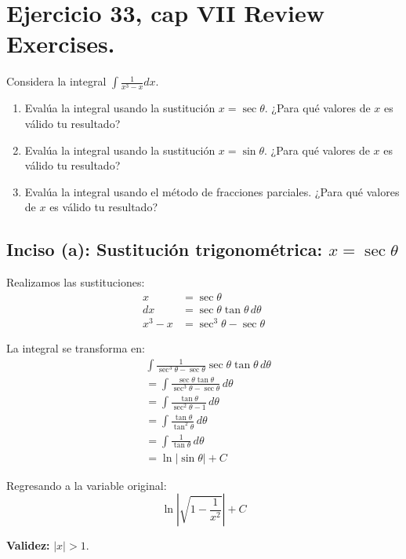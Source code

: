 \documentclass[11pt,letterpaper]{article}
\begin{document}
\section{Ejercicio 33, cap VII Review Exercises.}
Considera la integral $\displaystyle\int \frac{1}{x^3 - x} dx$.

\begin{enumerate}[label=(\alph*)]
    \item Evalúa la integral usando la sustitución $x = \sec \theta$. 
    ¿Para qué valores de $x$ es válido tu resultado?

    \item Evalúa la integral usando la sustitución $x = \sin \theta$. 
    ¿Para qué valores de $x$ es válido tu resultado?

    \item Evalúa la integral usando el método de fracciones parciales. 
    ¿Para qué valores de $x$ es válido tu resultado?
\end{enumerate}

\subsection*{Inciso (a): Sustitución trigonométrica: $x = \sec \theta$}


Realizamos las sustituciones:
\begin{align*}
x &= \sec \theta \\
dx &= \sec \theta \tan \theta \, d\theta \\
x^3 - x &= \sec^3\theta - \sec \theta
\end{align*}

La integral se transforma en:
\begin{align*}
&\int \frac{1}{\sec^3\theta - \sec \theta} \sec \theta \tan \theta \, d\theta \\
&= \int \frac{\sec \theta \tan \theta}{\sec^3\theta - \sec \theta} \, d\theta \\
&= \int \frac{\tan \theta}{\sec^2\theta - 1} \, d\theta \\
&= \int \frac{\tan \theta}{\tan^2\theta} \, d\theta \\
&= \int \frac{1}{\tan \theta} \, d\theta \\
&= \ln|\sin \theta| + C
\end{align*}

Regresando a la variable original:
\[ \ln\left|\sqrt{1 - \frac{1}{x^2}}\right| + C \]

\textbf{Validez:} $|x| > 1$.
\end{document}
